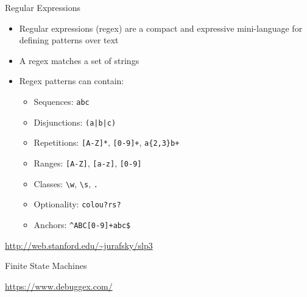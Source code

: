 \documentclass[10pt]{beamer}
\newcommand{\code}[1]{\colorbox{light-gray}{\texttt{#1}}}
\begin{document}
\begin{frame}{Regular Expressions}
\begin{itemize}
  \item \alert{Regular expressions} (regex) are a compact and expressive mini-language for defining \alert{patterns} over text
  \item A regex \alert{matches} a set of strings
  \item Regex patterns can contain:
  \begin{itemize}
    \item Sequences: \code{abc}
    \item Disjunctions: \code{(a|b|c)}
    \item Repetitions: \code{[A-Z]*}, \code{[0-9]+}, \code{a\{2,3\}b+}
    \item Ranges: \code{[A-Z]}, \code{[a-z]}, \code{[0-9]}
    \item Classes: \code{\textbackslash w}, \code{\textbackslash s}, \code{.}
    \item Optionality: \code{colou?rs?}
    \item Anchors: \code{\^{}ABC[0-9]+abc\$}
  \end{itemize}
\end{itemize}
\begin{center}
  \textcolor{blue}{\url{http://web.stanford.edu/~jurafsky/slp3}}
\end{center}
\end{frame}

\begin{frame}{Finite State Machines}
  \begin{center}
  \end{center}
  \begin{center}
    \textcolor{blue}{\url{https://www.debuggex.com/}}
  \end{center}
\end{frame}
\end{document}
